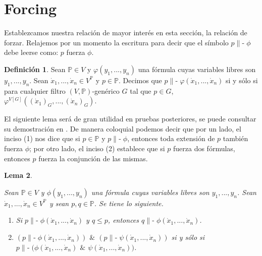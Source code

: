 \documentclass[11pt]{unam_tesis1}
\theoremstyle{MyThmStyle}
\theoremstyle{definition}
\newtheorem{definition}{Definici\'on}[chapter]
\theoremstyle{plain}
\newtheorem{lemma}[definition]{Lema}
\theoremstyle{remark}
\def\forces{\mathop{\parallel\!\!\!-}\nolimits}
\let\Vdash\forces
\let\leq\leqslant
\begin{document}
\section{Forcing}

Establezcamos nuestra relaci\'on de mayor inter\'es en esta secci\'on, la relaci\'on de forzar. Relajemos por un momento la escritura para decir que el s\'imbolo $p\Vdash \phi$ debe leerse como: $p$ fuerza $\phi$. 

\begin{definition}\label{forzar}
Sean $\mathbb P\in V$ y $\varphi(y_1,...,y_n)$ una f\'ormula cuyas variables libres son $y_1,...,y_n$. Sean $\dot x_1,...,\dot x_n\in V^{\mathbb P}$ y $p\in \mathbb P$. Decimos que $p\Vdash \varphi(\dot x_1,..., \dot x_n)$ si y s\'olo si para cualquier filtro $(V,\mathbb P)$-gen\'erico $G$ tal que $p\in G$, $\varphi^{V[G]}((\dot x_1)_G,..., (\dot x_n)_G)$.
\end{definition}

El siguiente lema ser\'a de gran utilidad en pruebas posteriores, se puede consultar su demostraci\'on en \cite[VII Lemma 3.2]{kunen}. De manera coloquial podemos decir que por un lado, el inciso (1) nos dice que si $p\in \mathbb P$ y $p\Vdash \phi$, entonces toda extensi\'on de $p$ tambi\'en fuerza $\phi$; por otro lado, el inciso (2) establece que si $p$ fuerza dos f\'ormulas, entonces $p$ fuerza la conjunci\'on de las mismas.

\begin{lemma}\label{alguienmasfuerte}

Sean $\mathbb P\in V$ y $\phi(y_1,...,y_n)$ una f\'ormula cuyas variables libres son $y_1,...,y_n$. Sean $\dot x_1,...,\dot x_n\in V^{\mathbb P}$ y sean $p,q \in \mathbb P$. Se tiene lo siguiente. 

\begin{enumerate}

\item Si $p\Vdash \phi (\dot x_1,...,\dot x_n)$ y $q\leq p$, entonces $q\Vdash \phi (\dot x_1,...,\dot x_n)$.
\item $(p\Vdash \phi (\dot x_1,...,\dot x_n))$ $\&
$ $(p\Vdash \psi (\dot x_1,...,\dot x_n))$ si y s\'olo si $p\Vdash (\phi (\dot x_1,...,\dot x_n)$ $\&$ $\psi (\dot x_1,...,\dot x_n))$.

\end{enumerate}

\end{lemma}
\end{document}
